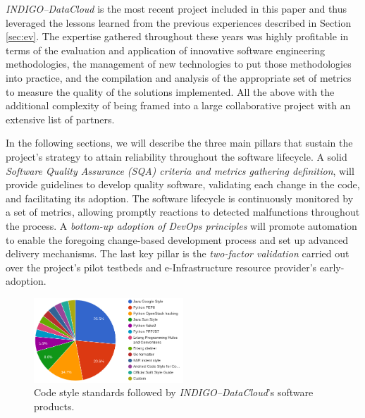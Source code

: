 \documentclass[journal]{IEEEtran}
\begin{document}
{\sl INDIGO--DataCloud} is the most recent project included in this paper and thus
leveraged the lessons learned from the previous experiences described in
Section \ref{sec:ev}. The expertise gathered throughout these years was highly
profitable in terms of the evaluation and application of innovative software engineering
methodologies, the management of new technologies to put those methodologies
into practice, and the compilation and analysis of the appropriate set of metrics to measure the
quality of the solutions implemented. All the above with the additional complexity of being framed into a
large collaborative project with an extensive list of partners.

In the following sections, we will describe the three main pillars that sustain the project's strategy to attain reliability throughout the
software lifecycle. A solid \textit{Software Quality Assurance (SQA) criteria
and metrics gathering definition}, will provide guidelines to develop quality
software, validating each change in the code, and facilitating its adoption. The software lifecycle is continuously monitored
by a set of metrics, allowing promptly reactions to detected malfunctions throughout the
process. A \textit{bottom-up adoption of DevOps principles} will promote automation to enable
the foregoing change-based development process and set up advanced delivery mechanisms.
The last key pillar is the \textit{two-factor validation} carried out over the project's pilot testbeds and
e-Infrastructure resource provider's early-adoption.



\begin{figure}[ht]
\centering
\includegraphics[width=0.5\textwidth]{images/codestyle.png}
\caption{Code style standards followed by {\sl INDIGO--DataCloud}'s software products.}
\label{fig:fig_codestyle}
\end{figure}
\end{document}
